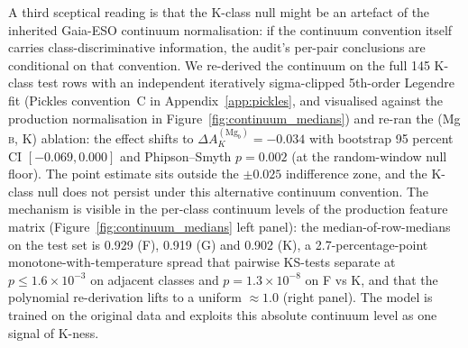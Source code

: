 \documentclass[11pt,a4paper]{article}
\newcommand{\Mgb}{Mg\,\textsc{b}\xspace}
\newcommand{\dA}{\Delta A}
\begin{document}
A third sceptical reading is that the K-class null might be an artefact of the inherited Gaia-ESO continuum normalisation: if the continuum convention itself carries class-discriminative information, the audit's per-pair conclusions are conditional on that convention. We re-derived the continuum on the full 145 K-class test rows with an independent iteratively sigma-clipped 5th-order Legendre fit (Pickles convention~C in Appendix~\ref{app:pickles}, and visualised against the production normalisation in Figure~\ref{fig:continuum_medians}) and re-ran the (\Mgb, K) ablation: the effect shifts to $\dA_K^{(\mathrm{Mg}_b)} = -0.034$ with bootstrap 95 percent CI $[-0.069, 0.000]$ and Phipson--Smyth $p = 0.002$ (at the random-window null floor). The point estimate sits outside the $\pm 0.025$ indifference zone, and the K-class null does not persist under this alternative continuum convention. The mechanism is visible in the per-class continuum levels of the production feature matrix (Figure~\ref{fig:continuum_medians} left panel): the median-of-row-medians on the test set is 0.929 (F), 0.919 (G) and 0.902 (K), a 2.7-percentage-point monotone-with-temperature spread that pairwise KS-tests separate at $p \leq 1.6 \times 10^{-3}$ on adjacent classes and $p = 1.3 \times 10^{-8}$ on F vs K, and that the polynomial re-derivation lifts to a uniform $\approx 1.0$ (right panel). The model is trained on the original data and exploits this absolute continuum level as one signal of K-ness.
\end{document}
